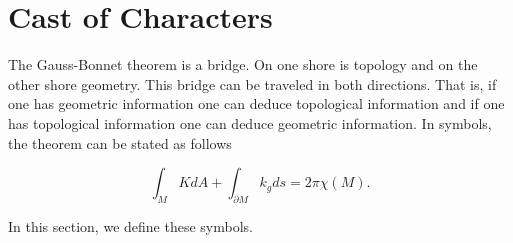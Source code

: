 
\section{Cast of Characters}
\label{sec:cast}


The Gauss-Bonnet theorem is a bridge. On one shore is topology and
on the other shore geometry. This bridge can be traveled in both directions.
That is, if one has geometric information one can deduce topological information and
if one has topological information one can deduce geometric information.
In symbols, the theorem can be stated as follows

$$\int_M K dA + \int_{\partial M} k_g ds = 2\pi \chi(M).$$

In this section, we define these symbols.




















